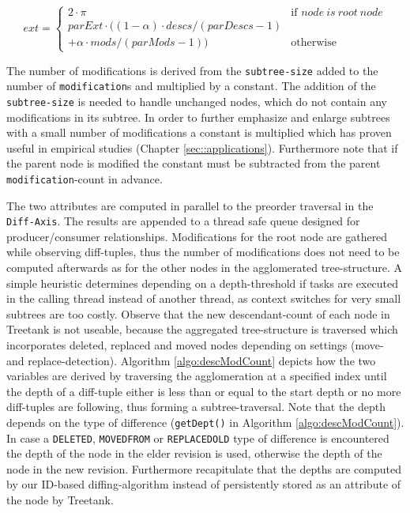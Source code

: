 \begin{equation}
ext = \left\{ \begin{array}{cl}
2 \cdot \pi & \textrm{if }node\ is\ root\ node\\
parExt \cdot ((1-\alpha) \cdot descs / (parDescs - 1) \\+ \alpha \cdot mods / (parMods - 1)) & \textrm{otherwise}\end{array}\right.
\end{equation}

The number of modifications is derived from the \texttt{subtree-size} added to the number of \texttt{modification}s and multiplied by a constant. The addition of the \texttt{subtree-size} is needed to handle unchanged nodes, which do not contain any modifications in its subtree. In order to further emphasize and enlarge subtrees with a small number of modifications a constant is multiplied which has proven useful in empirical studies (Chapter \ref{sec::applications}). Furthermore note that if the parent node is modified the constant must be subtracted from the parent \texttt{modification}-count in advance.

The two attributes are computed in parallel to the preorder traversal in the \texttt{Diff-Axis}. The results are appended to a thread safe queue designed for producer/consumer relationships. Modifications for the root node are gathered while observing diff-tuples, thus the number of modifications does not need to be computed afterwards as for the other nodes in the agglomerated tree-structure. A simple heuristic determines depending on a depth-threshold if tasks are executed in the calling thread instead of another thread, as context switches for very small subtrees are too costly. Observe that the new descendant-count of each node in Treetank is not useable, because the aggregated tree-structure is traversed which incorporates deleted, replaced and moved nodes depending on settings (move- and replace-detection). Algorithm \ref{algo:descModCount} depicts how the two variables are derived by traversing the agglomeration at a specified index until the depth of a diff-tuple either is less than or equal to the start depth or no more diff-tuples are following, thus forming a subtree-traversal. Note that the depth depends on the type of difference (\texttt{getDept()} in Algorithm \ref{algo:descModCount}). In case a \texttt{DELETED}, \texttt{MOVEDFROM} or \texttt{REPLACEDOLD} type of difference is encountered the depth of the node in the elder revision is used, otherwise the depth of the node in the new revision. Furthermore recapitulate that the depths are computed by our ID-based diffing-algorithm instead of persistently stored as an attribute of the node by Treetank.

